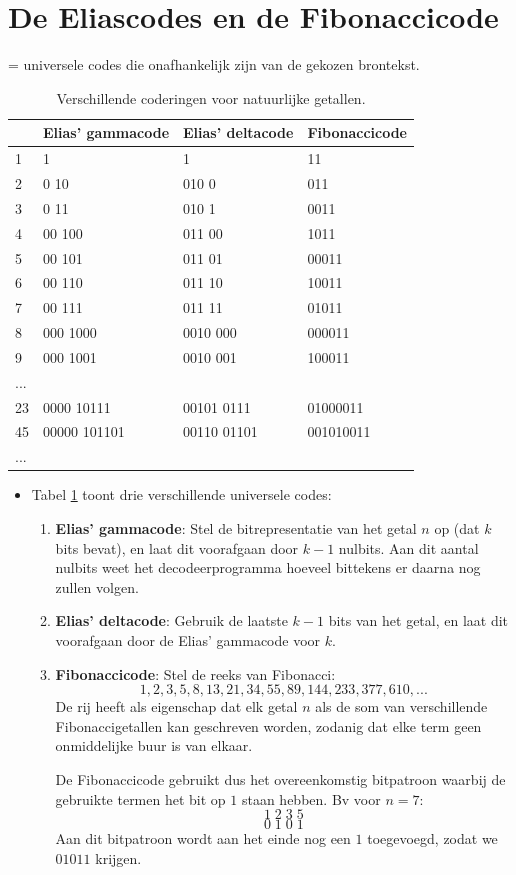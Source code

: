 \documentclass{report}
\begin{document}
\section{De Eliascodes en de Fibonaccicode}
= universele codes die onafhankelijk zijn van de gekozen brontekst.
\begin{table}[ht]
	\centering
	\begin{tabular}{| l | l | l | l |}
		\hline
		& Elias' gammacode & Elias' deltacode & Fibonaccicode \\
		\hline
		1   & 1            & 1           & 11 \\
		2   & 0 10         & 010 0		 & 011\\
		3   & 0 11         & 010 1		 & 0011\\
		4   & 00 100       & 011 00		 & 1011\\
		5   & 00 101       & 011 01		 & 00011\\
		6   & 00 110       & 011 10		 & 10011\\
		7   & 00 111       & 011 11		 & 01011\\
		8   & 000 1000     & 0010 000    & 000011\\
		9   & 000 1001     & 0010 001    & 100011\\
		... &              & 			 & \\
		23  & 0000 10111   & 00101 0111  & 01000011\\
		45  & 00000 101101 & 00110 01101 & 001010011\\
		... &              & 			 & \\
		\hline
	\end{tabular}
	\caption{Verschillende coderingen voor natuurlijke getallen.}
	\label{table:universal_codes}
\end{table}
\begin{itemize}
	\item[\info] Tabel \ref{table:universal_codes} toont drie verschillende universele codes:
	\begin{enumerate}
		\item \textbf{Elias' gammacode}: Stel de bitrepresentatie van het getal $n$ op (dat $k$ bits bevat), en laat dit voorafgaan door $k - 1$ nulbits. Aan dit aantal nulbits weet het decodeerprogramma hoeveel bittekens er daarna nog zullen volgen.
		\item \textbf{Elias' deltacode}: Gebruik de laatste $k - 1$ bits van het getal, en laat dit voorafgaan door de Elias' gammacode voor $k$.
		\item \textbf{Fibonaccicode}: Stel de reeks van Fibonacci:
		$$1, 2, 3, 5, 8, 13, 21, 34, 55, 89, 144, 233, 377, 610, ...$$
		De rij heeft als eigenschap dat elk getal $n$ als de som van verschillende Fibonaccigetallen kan geschreven worden, zodanig dat elke term geen onmiddelijke buur is van elkaar.

		De Fibonaccicode gebruikt dus het overeenkomstig bitpatroon waarbij de gebruikte termen het bit op $1$ staan hebben. Bv voor $n = 7$:
		$$1\;2\;3\;5$$
		$$0\;1\;0\;1$$
		Aan dit bitpatroon wordt aan het einde nog een $1$ toegevoegd, zodat we $01011$ krijgen.
	\end{enumerate}
\end{itemize}
\end{document}
